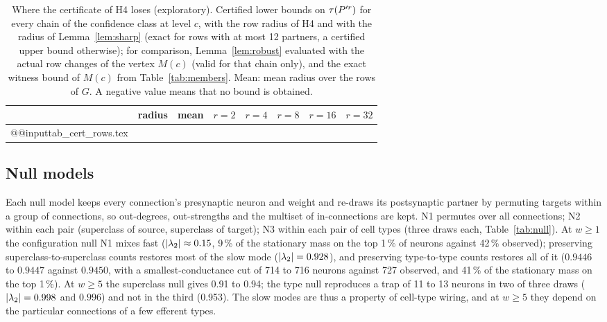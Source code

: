 \begin{table}[t]
\centering
\small
\caption{Where the certificate of H4 loses (exploratory). Certified lower bounds on $\tau(P'^r)$ for
every chain of the confidence class at level $c$, with the row radius of H4 and with the radius of
Lemma~\ref{lem:sharp} (exact for rows with at most 12 partners, a certified upper bound
otherwise); for comparison, Lemma~\ref{lem:robust} evaluated with the actual row changes
of the vertex $M(c)$ (valid for that chain only), and the exact witness bound of $M(c)$ from
Table~\ref{tab:members}. Mean: mean radius over the rows of $G$. A negative value means that no
bound is obtained.}
\label{tab:cert}
\begin{tabular}{@{}llrrrrrr@{}}
\toprule
 & radius & mean & $r=2$ & $r=4$ & $r=8$ & $r=16$ & $r=32$ \\
\midrule
\csname @@input\endcsname tab_cert_rows.tex
\bottomrule
\end{tabular}
\end{table}

\subsection{Null models}\label{sec:null}

Each null model keeps every connection's presynaptic neuron and weight and re-draws its postsynaptic
partner by permuting targets within a group of connections, so out-degrees, out-strengths and the
multiset of in-connections are kept. N1 permutes over all connections; N2 within each pair
(superclass of source, superclass of target); N3 within each pair of cell types (three draws each,
Table~\ref{tab:null}). At $w\ge1$ the configuration null N1 mixes fast ($\lvert\lambda_2\rvert\approx0.15$, 9\,\%
of the stationary mass on the top 1\,\% of neurons against 42\,\% observed); preserving
superclass-to-superclass counts restores most of the slow mode ($\lvert\lambda_2\rvert=0.928$), and preserving
type-to-type counts restores all of it ($0.9446$ to $0.9447$ against $0.9450$, with a smallest-conductance cut of
714 to 716 neurons against 727 observed, and 41\,\% of the stationary mass on the top 1\,\%). At $w\ge5$ the superclass
null gives 0.91 to 0.94; the type null reproduces a trap of 11 to 13 neurons in two of three draws
($\lvert\lambda_2\rvert=0.998$ and $0.996$) and not in the third (0.953). The slow modes are thus a property of
cell-type wiring, and at $w\ge5$ they depend on the particular connections of a few efferent types.

